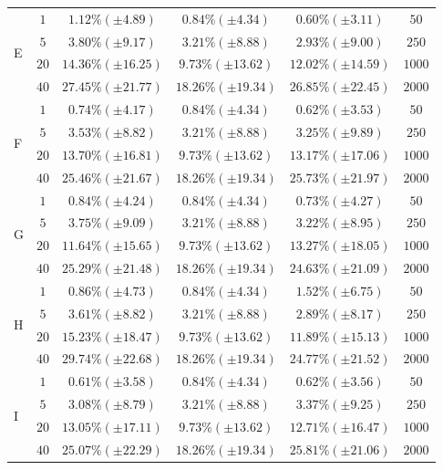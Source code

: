 \documentclass[cic,tc,english]{iiufrgs}
\begin{document}
\begin{table}
{\begin{tabular}{| l || c | c | c | c | c |}
\hline \hline \multirow{4}{*}{E} & $1$ &$ 1.12\% (\pm 4.89) $&$ 0.84\% (\pm 4.34) $&$ 0.60\% (\pm 3.11) $&$50$ \\ \cline{2-6} 
& $5$ & $3.80\% (\pm 9.17) $&$ 3.21\% (\pm 8.88) $&$ 2.93\% (\pm 9.00) $&$ 250 $ \\ \cline{2-6} 
& $20$ & $14.36\% (\pm 16.25) $&$ 9.73\% (\pm 13.62) $&$ 12.02\% (\pm 14.59) $&$ 1000 $ \\ \cline{2-6} 
& $40$ & $27.45\% (\pm 21.77) $&$ 18.26\% (\pm 19.34) $&$ 26.85\% (\pm 22.45) $&$ 2000 $ \\ \cline{2-6} 

\hline \hline \multirow{4}{*}{F} & $1$ &$ 0.74\% (\pm 4.17) $&$ 0.84\% (\pm 4.34) $&$ 0.62\% (\pm 3.53) $&$50$ \\ \cline{2-6} 
& $5$ & $3.53\% (\pm 8.82) $&$ 3.21\% (\pm 8.88) $&$ 3.25\% (\pm 9.89) $&$ 250 $ \\ \cline{2-6} 
& $20$ & $13.70\% (\pm 16.81) $&$ 9.73\% (\pm 13.62) $&$ 13.17\% (\pm 17.06) $&$ 1000 $ \\ \cline{2-6} 
& $40$ & $25.46\% (\pm 21.67) $&$ 18.26\% (\pm 19.34) $&$ 25.73\% (\pm 21.97) $&$ 2000 $ \\ \cline{2-6} 

\hline \hline \multirow{4}{*}{G} & $1$ &$ 0.84\% (\pm 4.24) $&$ 0.84\% (\pm 4.34) $&$ 0.73\% (\pm 4.27) $&$50$ \\ \cline{2-6} 
& $5$ & $3.75\% (\pm 9.09) $&$ 3.21\% (\pm 8.88) $&$ 3.22\% (\pm 8.95) $&$ 250 $ \\ \cline{2-6} 
& $20$ & $11.64\% (\pm 15.65) $&$ 9.73\% (\pm 13.62) $&$ 13.27\% (\pm 18.05) $&$ 1000 $ \\ \cline{2-6} 
& $40$ & $25.29\% (\pm 21.48) $&$ 18.26\% (\pm 19.34) $&$ 24.63\% (\pm 21.09) $&$ 2000 $ \\ \cline{2-6} 

\hline \hline \multirow{4}{*}{H} & $1$ &$ 0.86\% (\pm 4.73) $&$ 0.84\% (\pm 4.34) $&$ 1.52\% (\pm 6.75) $&$50$ \\ \cline{2-6} 
& $5$ & $3.61\% (\pm 8.82) $&$ 3.21\% (\pm 8.88) $&$ 2.89\% (\pm 8.17) $&$ 250 $ \\ \cline{2-6} 
& $20$ & $15.23\% (\pm 18.47) $&$ 9.73\% (\pm 13.62) $&$ 11.89\% (\pm 15.13) $&$ 1000 $ \\ \cline{2-6} 
& $40$ & $29.74\% (\pm 22.68) $&$ 18.26\% (\pm 19.34) $&$ 24.77\% (\pm 21.52) $&$ 2000 $ \\ \cline{2-6} 

\hline \hline \multirow{4}{*}{I} & $1$ &$ 0.61\% (\pm 3.58) $&$ 0.84\% (\pm 4.34) $&$ 0.62\% (\pm 3.56) $&$50$ \\ \cline{2-6} 
& $5$ & $3.08\% (\pm 8.79) $&$ 3.21\% (\pm 8.88) $&$ 3.37\% (\pm 9.25) $&$ 250 $ \\ \cline{2-6} 
& $20$ & $13.05\% (\pm 17.11) $&$ 9.73\% (\pm 13.62) $&$ 12.71\% (\pm 16.47) $&$ 1000 $ \\ \cline{2-6} 
& $40$ & $25.07\% (\pm 22.29) $&$ 18.26\% (\pm 19.34) $&$ 25.81\% (\pm 21.06) $&$ 2000 $ \\ \cline{2-6} 


\end{tabular}}
\end{table}
\end{document}
